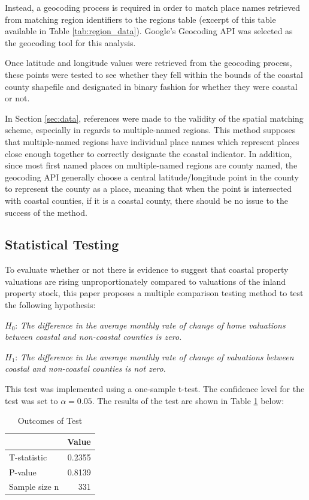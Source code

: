 \documentclass[12pt]{article}
\begin{document}
Instead, a geocoding process is required in order to match place names retrieved from matching region identifiers to the regions table (excerpt of this table available in Table \ref{tab:region_data}). Google's Geocoding API was selected as the geocoding tool for this analysis.

Once latitude and longitude values were retrieved from the geocoding process, these points were tested to see whether they fell within the bounds of the coastal county shapefile and designated in binary fashion for whether they were coastal or not.

In Section \ref{sec:data}, references were made to the validity of the spatial matching scheme, especially in regards to multiple-named regions. This method supposes that multiple-named regions have individual place names which represent places close enough together to correctly designate the coastal indicator. In addition, since most first named places on multiple-named regions are county named, the geocoding API generally choose a central latitude/longitude point in the county to represent the county as a place, meaning that when the point is intersected with coastal counties, if it is a coastal county, there should be no issue to the success of the method. 

\subsection{Statistical Testing}

To evaluate whether or not there is evidence to suggest that coastal property valuations are rising unproportionately compared to valuations of the inland property stock, this paper proposes a multiple comparison testing method to test the following hypothesis:

$H_0$: \emph{The difference in the average monthly rate of change of home valuations between coastal and non-coastal counties is zero.}

\textbf{$H_1$}: \emph{The difference in the average monthly rate of change of valuations between coastal and non-coastal counties is not zero.}

This test was implemented using a one-sample t-test. The confidence level for the test was set to $\alpha = 0.05$. The results of the test are shown in Table \ref{tab:test_results} below:

\begin{table}[ht]
\centering
\caption{Outcomes of Test}
\label{tab:test_results}
\begin{tabular}{lr}
\hline
& \textbf{Value} \\
\hline
T-statistic        & 0.2355 \\
P-value            & 0.8139  \\
Sample size n      & 331 \\
\hline
\end{tabular}
\end{table}
\end{document}
